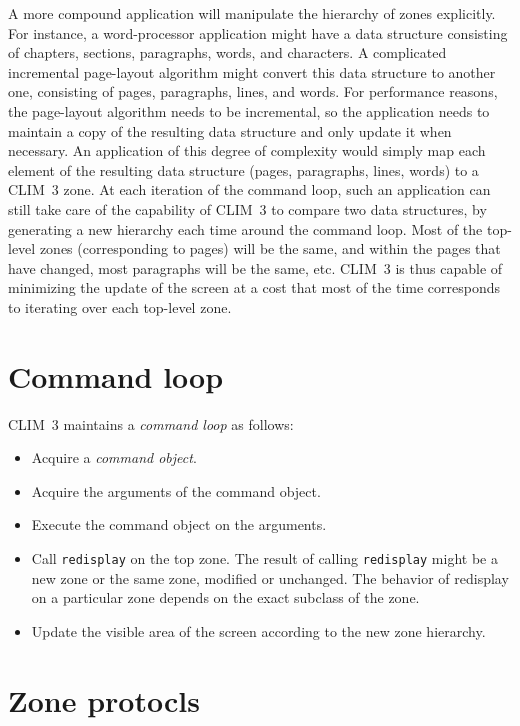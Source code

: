 \documentclass{report}
\def\clim{CLIM~3}
\def\code#1{\texttt{#1}}
\begin{document}
A more compound application will manipulate the hierarchy of zones
explicitly.  For instance, a word-processor application might have a
data structure consisting of chapters, sections, paragraphs, words,
and characters.  A complicated incremental page-layout algorithm might
convert this data structure to another one, consisting of pages,
paragraphs, lines, and words.  For performance reasons, the
page-layout algorithm needs to be incremental, so the application
needs to maintain a copy of the resulting data structure and only
update it when necessary.  An application of this degree of complexity
would simply map each element of the resulting data structure (pages,
paragraphs, lines, words) to a \clim{} zone.  At each iteration of
the command loop, such an application can still take care of the
capability of \clim{} to compare two data structures, by generating a
new hierarchy each time around the command loop.  Most of the
top-level zones (corresponding to pages) will be the same, and
within the pages that have changed, most paragraphs will be the same,
etc.  \clim{} is thus capable of minimizing the update of the screen at
a cost that most of the time corresponds to iterating over each
top-level zone. 

\chapter{Command loop}

\clim{} maintains a \emph{command loop} as follows:

\begin{itemize}
\item Acquire a \emph{command object}.
\item Acquire the arguments of the command object.
\item Execute the command object on the arguments.
\item Call \code{redisplay} on the top zone.  The result of calling
  \code{redisplay} might be a new zone or the same zone, modified
  or unchanged.  The behavior of redisplay on a particular zone
  depends on the exact subclass of the zone.
\item Update the visible area of the screen according to the new
  zone hierarchy.
\end{itemize}

\chapter{Zone protocls}
\end{document}
